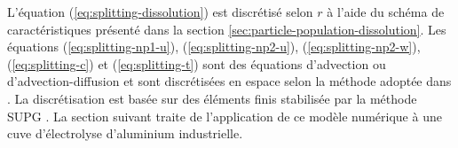 L'équation (\ref{eq:splitting-dissolution}) est discrétisé selon $r$
à l'aide du schéma de caractéristiques présenté dans la section
\ref{sec:particle-population-dissolution}. Les équations
(\ref{eq:splitting-np1-u}), (\ref{eq:splitting-np2-u}),
(\ref{eq:splitting-np2-w}), (\ref{eq:splitting-c}) et
(\ref{eq:splitting-t}) sont des équations d'advection ou
d'advection-diffusion et sont discrétisées en espace selon la
méthode adoptée dans \cite{Hofer2011}. La discrétisation est basée
sur des éléments finis stabilisée par la méthode SUPG
\cite{Quarteroni2008}. La section suivant traite de l'application de
ce modèle numérique à une cuve d'électrolyse d'aluminium industrielle.
